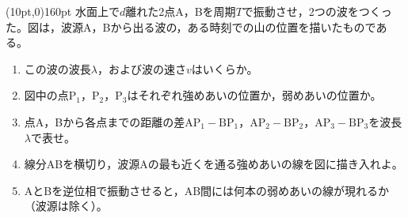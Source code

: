 \hakosyokika
\item
    \begin{mawarikomi}(10pt,0){160pt}{}
    水面上で$d$離れた2点A，Bを周期$T$で振動させ，2つの波をつくった。図は，波源A，Bから出る波の，ある時刻での山の位置を描いたものである。
        \begin{enumerate}
            \item この波の波長$\lambda $，および波の速さ$v$はいくらか。
            \item 図中の点$\mathrm{P_1}$，$\mathrm{P_2}$，$\mathrm{P_3}$はそれぞれ強めあいの位置か，弱めあいの位置か。
            \item 点A，Bから各点までの距離の差$\mathrm{AP_1-BP_1}$，$\mathrm{AP_2-BP_2}$，$\mathrm{AP_3-BP_3}$を波長$\lambda $で表せ。
            \item 線分ABを横切り，波源Aの最も近くを通る強めあいの線を図に描き入れよ。
            \item AとBを逆位相で振動させると，AB間には何本の弱めあいの線が現れるか（波源は除く）。
        \end{enumerate}
    \end{mawarikomi}